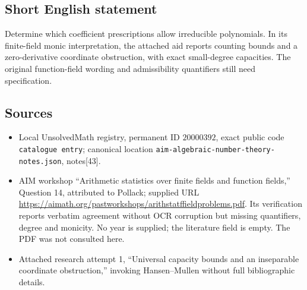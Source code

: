 \documentclass[11pt]{article}
\begin{document}
\subsection{Short English statement}
Determine which coefficient prescriptions allow irreducible polynomials. In its finite-field monic interpretation, the attached aid reports counting bounds and a zero-derivative coordinate obstruction, with exact small-degree capacities. The original function-field wording and admissibility quantifiers still need specification.
\subsection{Sources}
\begin{itemize}
\item Local UnsolvedMath registry, permanent ID \(20000392\), exact public code \texttt{catalogue entry}; canonical location \texttt{aim-algebraic-number-theory-notes.json}, notes[43].
\item AIM workshop ``Arithmetic statistics over finite fields and function fields,'' Question 14, attributed to Pollack; supplied URL \url{https://aimath.org/pastworkshops/arithstatffieldproblems.pdf}. Its verification reports verbatim agreement without OCR corruption but missing quantifiers, degree and monicity. No year is supplied; the literature field is empty. The PDF was not consulted here.
\item Attached research attempt 1, ``Universal capacity bounds and an inseparable coordinate obstruction,'' invoking Hansen--Mullen without full bibliographic details.
\end{itemize}
\end{document}
